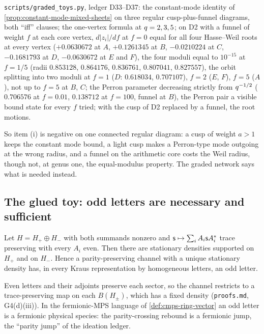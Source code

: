 \begin{numerical}
\label{num:funnel-on-d2}
\texttt{scripts/graded\_toys.py}, ledger D33--D37: the constant-mode identity of \cref{prop:constant-mode-mixed-sheets}
on three regular cusp-plus-funnel diagrams, both ``iff'' clauses; the one-vertex formula at $q = 2,3,5$; on D2 with a
funnel of weight $f$ at each core vertex, $d|z_i|/df$ at $f = 0$ equal for all four Hasse--Weil roots at every vertex
($+0.0630672$ at $A$, $+0.1261345$ at $B$, $-0.0210224$ at $C$, $-0.1681793$ at $D$, $-0.0630672$ at $E$ and $F$), the
four moduli equal to $10^{-15}$ at $f = 1/5$ (radii $0.853128$, $0.864176$, $0.836761$, $0.807041$, $0.827557$), the
orbit splitting into two moduli at $f = 1$ ($D$: $0.618034$, $0.707107$), $f = 2$ ($E$, $F$), $f = 5$ ($A$), not up to
$f = 5$ at $B$, $C$; the Perron parameter decreasing strictly from $q^{-1/2}$ ($0.706576$ at $f = 0.01$, $0.138712$
at $f = 100$, funnel at $B$), the Perron pair a visible bound state for every $f$ tried; with the cusp of D2 replaced
by a funnel, the root motions.
\end{numerical}

So item (i) is negative on one connected regular diagram: a cusp of weight $a>1$ keeps the constant mode bound, a
light cusp makes a Perron-type mode outgoing at the wrong radius, and a funnel on the arithmetic core costs the
Weil radius, though not, at genus one, the equal-modulus property. The graded network says what is needed instead.

\subsection{The glued toy: odd letters are necessary and sufficient}

\begin{lemma}
\label{lem:even-letters-two-fixed-points}
Let $H = H_+\oplus H_-$ with both summands nonzero and $\mathsf s\mapsto\sum_iA_i\mathsf s A_i^{*}$ trace preserving with
every $A_i$ even. Then there are stationary densities supported on $H_+$ and on $H_-$. Hence a parity-preserving
channel with a unique stationary density has, in every Kraus representation by homogeneous letters, an odd letter.
\end{lemma}

Even letters and their adjoints preserve each sector, so the channel restricts to a trace-preserving map on
each $B(H_\pm)$, which has a fixed density (\texttt{proofs.md}, G4(d)(iii)). In the fermionic-MPS language of
\cref{def:cmps-ring-vector} an odd letter is a fermionic physical species: the parity-crossing rebound is a
fermionic jump, the ``parity jump'' of the ideation ledger.

